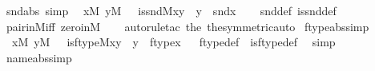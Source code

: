 \begin{isabellebody}
\ snd{\isacharunderscore}{\kern0pt}abs\ {\isacharbrackleft}{\kern0pt}simp{\isacharbrackright}{\kern0pt}{\isacharcolon}{\kern0pt}\isanewline
\ \ {\isachardoublequoteopen}{\isasymlbrakk}x{\isasymin}M{\isacharsemicolon}{\kern0pt}\ y{\isasymin}M\ {\isasymrbrakk}\ {\isasymLongrightarrow}\ is{\isacharunderscore}{\kern0pt}snd{\isacharparenleft}{\kern0pt}{\isacharhash}{\kern0pt}{\isacharhash}{\kern0pt}M{\isacharcomma}{\kern0pt}x{\isacharcomma}{\kern0pt}y{\isacharparenright}{\kern0pt}\ {\isasymlongleftrightarrow}\ y\ {\isacharequal}{\kern0pt}\ snd{\isacharparenleft}{\kern0pt}x{\isacharparenright}{\kern0pt}{\isachardoublequoteclose}\isanewline
%
\isadelimproof
\ \ %
\endisadelimproof
%
\isatagproof
{}\isamarkupfalse%
\ snd{\isacharunderscore}{\kern0pt}def\ is{\isacharunderscore}{\kern0pt}snd{\isacharunderscore}{\kern0pt}def\ \isamarkupfalse%
\ pair{\isacharunderscore}{\kern0pt}in{\isacharunderscore}{\kern0pt}M{\isacharunderscore}{\kern0pt}iff\ zero{\isacharunderscore}{\kern0pt}in{\isacharunderscore}{\kern0pt}M\isanewline
\ \ \isamarkupfalse%
\ {\isacharparenleft}{\kern0pt}auto{\isacharsemicolon}{\kern0pt}rule{\isacharunderscore}{\kern0pt}tac\ the{\isacharunderscore}{\kern0pt}{}\ the{\isacharunderscore}{\kern0pt}{}{\isacharbrackleft}{\kern0pt}symmetric{\isacharbrackright}{\kern0pt}{\isacharcomma}{\kern0pt}auto{\isacharparenright}{\kern0pt}%
\endisatagproof
{\isafoldproof}%
%
\isadelimproof
\isanewline
%
\endisadelimproof
\isanewline
{}\isamarkupfalse%
\ ftype{\isacharunderscore}{\kern0pt}abs{\isacharbrackleft}{\kern0pt}simp{\isacharbrackright}{\kern0pt}\ {\isacharcolon}{\kern0pt}\isanewline
\ \ {\isachardoublequoteopen}{\isasymlbrakk}x{\isasymin}M{\isacharsemicolon}{\kern0pt}\ y{\isasymin}M\ {\isasymrbrakk}\ {\isasymLongrightarrow}\ is{\isacharunderscore}{\kern0pt}ftype{\isacharparenleft}{\kern0pt}{\isacharhash}{\kern0pt}{\isacharhash}{\kern0pt}M{\isacharcomma}{\kern0pt}x{\isacharcomma}{\kern0pt}y{\isacharparenright}{\kern0pt}\ {\isasymlongleftrightarrow}\ y\ {\isacharequal}{\kern0pt}\ ftype{\isacharparenleft}{\kern0pt}x{\isacharparenright}{\kern0pt}{\isachardoublequoteclose}%
\isadelimproof
\ %
\endisadelimproof
%
\isatagproof
{}\isamarkupfalse%
\ ftype{\isacharunderscore}{\kern0pt}def\ \ is{\isacharunderscore}{\kern0pt}ftype{\isacharunderscore}{\kern0pt}def\ \isamarkupfalse%
\ simp%
\endisatagproof
{\isafoldproof}%
%
\isadelimproof
%
\endisadelimproof
\isanewline
\isanewline
{}\isamarkupfalse%
\ name{}{\isacharunderscore}{\kern0pt}abs{\isacharbrackleft}{\kern0pt}simp{\isacharbrackright}{\kern0pt}\ {\isacharcolon}{\kern0pt}\isanewline

\end{isabellebody}
